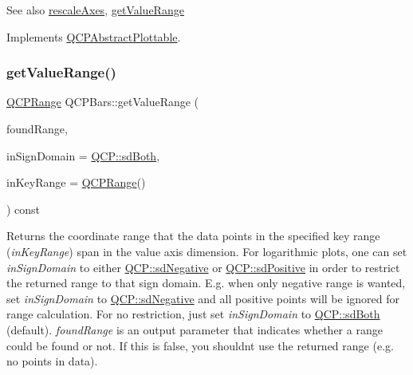 \begin{DoxySeeAlso}{See also}
\mbox{\hyperlink{class_q_c_p_abstract_plottable_a1491c4a606bccd2d09e65e11b79eb882}{rescale\+Axes}}, \mbox{\hyperlink{class_q_c_p_bars_a02cee4bf94d48a1e5f6fc185d9a10477}{get\+Value\+Range}} 
\end{DoxySeeAlso}


Implements \mbox{\hyperlink{class_q_c_p_abstract_plottable_a4da16d3cd4b509e1104a9b0275623c96}{Q\+C\+P\+Abstract\+Plottable}}.

\mbox{\label{class_q_c_p_bars_a02cee4bf94d48a1e5f6fc185d9a10477}} 
\subsubsection{\texorpdfstring{get\+Value\+Range()}{getValueRange()}}
{\footnotesize\ttfamily \mbox{\hyperlink{class_q_c_p_range}{Q\+C\+P\+Range}} Q\+C\+P\+Bars\+::get\+Value\+Range (\begin{DoxyParamCaption}\item[{bool \&}]{found\+Range,  }\item[{\mbox{\hyperlink{namespace_q_c_p_afd50e7cf431af385614987d8553ff8a9}{Q\+C\+P\+::\+Sign\+Domain}}}]{in\+Sign\+Domain = {\ttfamily \mbox{\hyperlink{namespace_q_c_p_afd50e7cf431af385614987d8553ff8a9aa38352ef02d51ddfa4399d9551566e24}{Q\+C\+P\+::sd\+Both}}},  }\item[{const \mbox{\hyperlink{class_q_c_p_range}{Q\+C\+P\+Range}} \&}]{in\+Key\+Range = {\ttfamily \mbox{\hyperlink{class_q_c_p_range}{Q\+C\+P\+Range}}()} }\end{DoxyParamCaption}) const\hspace{0.3cm}{\ttfamily [virtual]}}

Returns the coordinate range that the data points in the specified key range ({\itshape in\+Key\+Range}) span in the value axis dimension. For logarithmic plots, one can set {\itshape in\+Sign\+Domain} to either \mbox{\hyperlink{namespace_q_c_p_afd50e7cf431af385614987d8553ff8a9a2d18af0bc58f6528d1e82ce699fe4829}{Q\+C\+P\+::sd\+Negative}} or \mbox{\hyperlink{namespace_q_c_p_afd50e7cf431af385614987d8553ff8a9a584784b75fb816abcc627cf743bb699f}{Q\+C\+P\+::sd\+Positive}} in order to restrict the returned range to that sign domain. E.\+g. when only negative range is wanted, set {\itshape in\+Sign\+Domain} to \mbox{\hyperlink{namespace_q_c_p_afd50e7cf431af385614987d8553ff8a9a2d18af0bc58f6528d1e82ce699fe4829}{Q\+C\+P\+::sd\+Negative}} and all positive points will be ignored for range calculation. For no restriction, just set {\itshape in\+Sign\+Domain} to \mbox{\hyperlink{namespace_q_c_p_afd50e7cf431af385614987d8553ff8a9aa38352ef02d51ddfa4399d9551566e24}{Q\+C\+P\+::sd\+Both}} (default). {\itshape found\+Range} is an output parameter that indicates whether a range could be found or not. If this is false, you shouldn\textquotesingle{}t use the returned range (e.\+g. no points in data).

